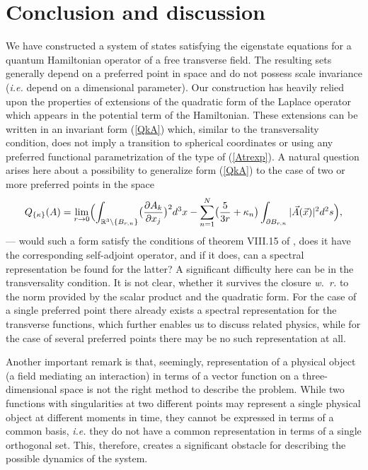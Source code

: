 \documentclass[12pt]{article}
\newcommand{\RR}{\mathbb{R}}
\begin{document}
\section{Conclusion and discussion}
	We have constructed a system of states 
	satisfying the eigenstate equations for a quantum Hamiltonian operator
	of a free transverse field.
	The resulting sets generally depend on a preferred point in space and
	do not possess scale invariance ({\it i.e.} depend on a dimensional parameter).
	Our construction has heavily relied upon the properties of extensions
	of the quadratic form of the Laplace operator which appears
    in the potential term of the Hamiltonian.
	These extensions can be written in an invariant form
(\ref{QkA})
	which, similar to the transversality condition, does not imply a transition
	to spherical coordinates or using any preferred functional parametrization
        of the type of
(\ref{Atrexp}).
	A natural question arises here about a possibility to generalize form
(\ref{QkA})
	to the case of two or more preferred points in the space
\begin{equation*}
        Q_{\{\kappa\}}(A) = \lim_{r\to 0}\Bigl(
    \int_{\RR^{3}\setminus \{B_{r,n}\}}
        \bigl(\frac{\partial A_{k}}{\partial x_{j}}\bigr)^{2} d^{3} x -
    \sum_{n=1}^{N}\bigl(\frac{5}{3r}	+ \kappa_{n}\bigr)
	\int_{\partial B_{r,n}} |\vec{A}(\vec{x})|^{2} d^{2} s \Bigr) ,
\end{equation*}
	--- would such a form satisfy the conditions of theorem VIII.15 of
\cite{RS1},
	does it have the corresponding self-adjoint operator, and if it does,
	can a spectral representation be found for the latter?
	A significant difficulty here can be in the transversality condition.
    It is not clear, whether it survives the closure {\it w.~r.} to
    the norm provided by the scalar product and the quadratic form.
	For the case of a single preferred point there already exists
	a spectral representation for the transverse functions,
	which further enables us to discuss related physics,
	while for the case of several preferred points there may be no
	such representation at all.

	Another important remark is that, seemingly, representation
of a physical object (a field mediating an interaction) in terms of a vector function
on a three-dimensional space is not the right method to describe the problem.
	While two functions with singularities at two different points may represent
	a single physical object at different moments in time, they
	cannot be expressed in terms of a common basis,
	{\it i.e.} they do not have a common representation in terms of a single
	orthogonal set.
	This, therefore, creates a significant obstacle for describing the possible
	dynamics of the system.
\end{document}
